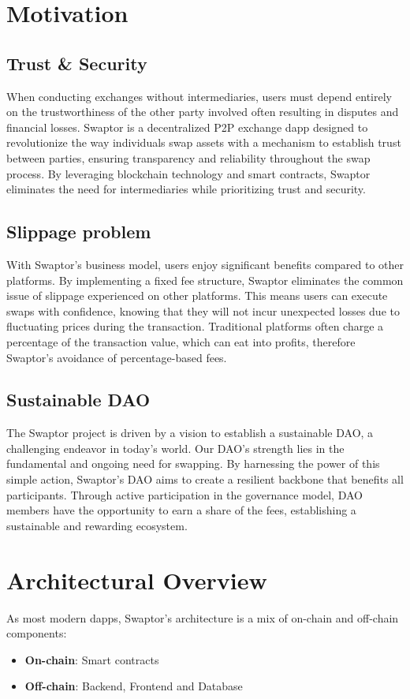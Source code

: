 \documentclass[12pt]{article}
\begin{document}
\newpage

\section{Motivation}

\subsection{Trust \& Security}
When conducting exchanges without intermediaries, users must depend entirely on the trustworthiness of the
other party involved often resulting in disputes and financial losses. Swaptor is a decentralized P2P exchange dapp designed to revolutionize
the way individuals swap assets with a mechanism to establish trust between parties, ensuring transparency
and reliability throughout the swap process. By leveraging blockchain technology and smart contracts,
Swaptor eliminates the need for intermediaries while prioritizing trust and security.

\subsection{Slippage problem}
With Swaptor's business model, users enjoy significant benefits compared to other platforms. By implementing
a fixed fee structure, Swaptor eliminates the common issue of slippage experienced on other platforms.
This means users can execute swaps with confidence, knowing that they will not incur unexpected losses due
to fluctuating prices during the transaction. Traditional platforms often charge a percentage of the transaction value,
which can eat into profits, therefore Swaptor's avoidance of percentage-based fees.

\subsection{Sustainable DAO}
The Swaptor project is driven by a vision to establish a sustainable DAO, a challenging endeavor in today's world.
Our DAO's strength lies in the fundamental and ongoing need for swapping. By harnessing the power of this simple action,
Swaptor's DAO aims to create a resilient backbone that benefits all participants. Through active participation in the
governance model, DAO members have the opportunity to earn a share of the fees, establishing a sustainable and rewarding ecosystem.

\newpage

\section{Architectural Overview} \label{form}
\indent As most modern dapps, Swaptor's architecture is a mix of on-chain and off-chain components:
\begin{itemize}
  \item \textbf{On-chain}: Smart contracts
  \item \textbf{Off-chain}: Backend, Frontend and Database
\end{itemize}
\end{document}
